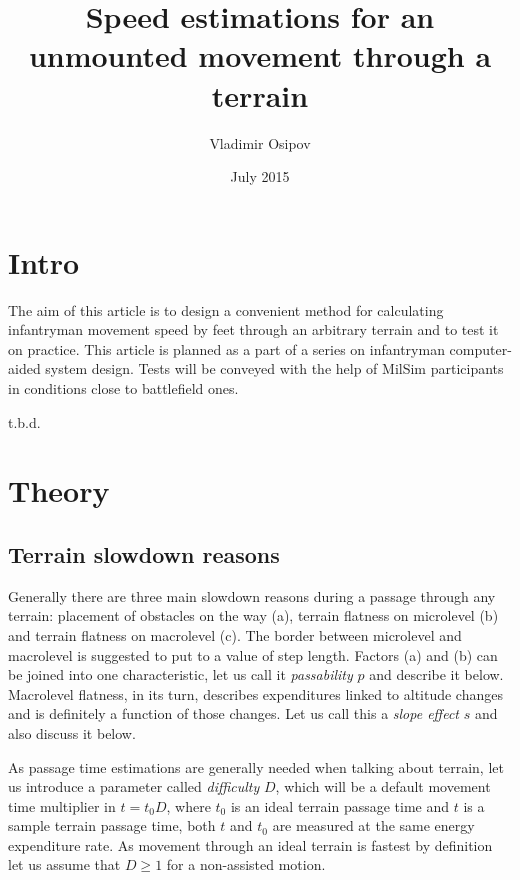 \documentclass[12pt]{article}
\begin{document}
\title{Speed estimations for an unmounted movement through a terrain}
\author{Vladimir Osipov}
\date{July 2015}
\maketitle

\section{Intro}

The aim of this article is to design a convenient method for calculating infantryman movement speed by feet through an arbitrary terrain and to test it on practice. This article is planned as a part of a series on infantryman computer-aided system design. Tests will be conveyed with the help of MilSim participants in conditions close to battlefield ones.

t.b.d.

\newpage

\section{Theory}

\subsection{Terrain slowdown reasons}

Generally there are three main slowdown reasons during a passage through any terrain: placement of obstacles on the way (a), terrain flatness on microlevel (b) and terrain flatness on macrolevel (c). The border between microlevel and macrolevel is suggested to put to a value of step length. Factors (a) and (b) can be joined into one characteristic, let us call it \textit{passability} $p$ and describe it below. Macrolevel flatness, in its turn, describes expenditures linked to altitude changes and is definitely a function of those changes. Let us call this a \textit{slope effect} $s$ and also discuss it below.

As passage time estimations are generally needed when talking about terrain, let us introduce a parameter called \textit{difficulty} $D$, which will be a default movement time multiplier in $t=t_{0}D$, where $t_{0}$ is an ideal terrain passage time and $t$ is a sample terrain passage time, both $t$ and $t_{0}$ are measured at the same energy expenditure rate. As movement through an ideal terrain is fastest by definition let us assume that $D\geq1$ for a non-assisted motion.
\end{document}
